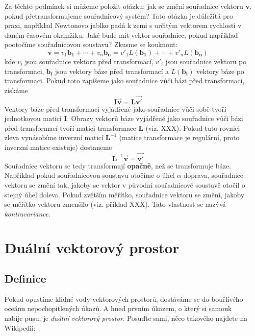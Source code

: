 \documentclass[a5paper,12pt]{amsbook}
\theoremstyle{definition}
\newcommand{\myscalar}[1]{#1}
\newcommand{\myvec}[1]{\bm{#1}}
\newcommand{\mycoord}[1]{\overrightarrow{\mathbf{#1}}}
\newcommand{\mymatrix}[1]{\mathbf{#1}}
\newcommand{\mymap}[1]{#1}
\begin{document}
Za těchto podmínek si můžeme položit otázku: jak se změní souřadnice vektoru $\myvec{v}$,
pokud přetransformujeme souřadnicový systém? Tato otázka je důležitá pro praxi, například
Newtonovo jablko padá k zemi s určitým vektorem rychlosti v daném časovém okamžiku. Jaké
bude mít vektor souřadnice, pokud například pootočíme souřadnicovou soustavu? Zkusme se
kouknout:
\begin{equation*}
\myvec{v} = \myscalar{v_1}\myvec{b_1} + \cdots + \myscalar{v_n}\myvec{b_n}
          = \myscalar{v'_1}\mymap{L}(\myvec{b_1}) + \cdots + \myscalar{v'_n}\mymap{L}(\myvec{b_n})
\end{equation*}
kde $\myscalar{v_i}$ jsou souřadnice vektoru před transformací, $\myscalar{v'_i}$ jsou souřadnice
vektoru po transformaci, $\myvec{b_i}$ jsou vektory báze před transformací a $\mymap{L}(\myvec{b_i})$
vektory báze po transformaci. Pokud toto zapíšeme jako souřadnice vůči bázi před transformací, získáme
\begin{equation*}
\mymatrix{I}\mycoord{v} = \mymatrix{L}\mycoord{v'}
\end{equation*}
Vektory báze před transformací vyjádřené jako souřadnice vůči sobě tvoří jednotkovou matici
$\mymatrix{I}$. Obrazy vektorů báze vyjádřené jako souřadnice vůči bázi před transformací
tvoří matici transformace $\mymatrix{L}$ (viz. XXX). Pokud tuto rovnici zleva vynásobíme
inverzní maticí $\mymatrix{L}^{-1}$ (matice transformace je regulární, proto inverzní
matice existuje) dostaneme
\begin{equation*}
\mymatrix{L}^{-1}\mycoord{v} = \mycoord{v'}
\end{equation*}
Souřadnice vektoru se tedy transformují \textbf{opačně}, než se transformuje báze.
Například pokud souřadnicovou soustavu otočíme o úhel $\alpha$ doprava, souřadnice vektoru
se změní tak, jakoby se vektor v původní souřadnicové soustavě otočil o stejný úhel doleva.
Pokud zvětším měřítko, souřadnice vektoru se změní, jakoby se měřítko vektoru zmenšilo (viz.
příklad XXX). Tato vlastnost se nazývá \textit{kontravariance}.

\chapter{Duální vektorový prostor}

\section{Definice}

\noindent Pokud opustíme klidné vody vektorových prostorů, dostáváme se do bouřlivého oceánu
nepochopitlených úkazů. A hned prvním úkazem, o který si samouk nabije pusu, je \textit{duální
vektorový prostor}. Posuďte sami, něco takového najdete na Wikipedii:
\end{document}
